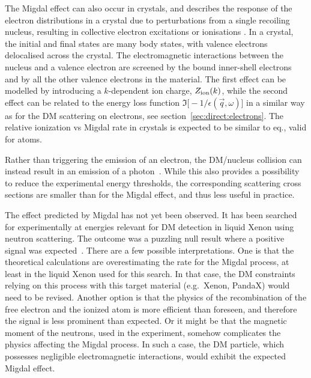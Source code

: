 \medskip


The Migdal effect can also occur in crystals, and describes the response of the electron distributions in a crystal due to perturbations  from a single recoiling nucleus, resulting in collective electron excitations or ionisations \cite{crystal:Migdal}. In a crystal, the initial and final states are many body states, with valence electrons delocalised across the crystal. The electromagnetic interactions between the nucleus and a valence electron are screened by the bound inner-shell electrons and by all the other valence electrons in the material. The first effect can be modelled by introducing a $k$-dependent ion charge, $Z_{\rm ion}(k)$, while the second effect can be related to the energy loss function $\Im\big[-1/\epsilon(\vec q,\omega)\big]$ in a similar way as for the DM scattering on electrons, see section~\ref{sec:direct:electrons}. 
The relative ionization vs Migdal rate in crystals is expected to be similar to eq., valid for atoms.


Rather than triggering the emission of an electron, the DM/nucleus collision can instead result in an emission of a photon~\cite{photon:DM:scattering}. 
While this also provides a possibility to reduce the experimental energy thresholds, the corresponding scattering cross sections are smaller than for the Migdal effect, and thus less useful in practice. 

\medskip


The effect predicted by Migdal has not yet been observed.
It has been searched for experimentally at energies relevant for DM detection in liquid Xenon using neutron scattering.
The outcome was a puzzling null result where a positive signal was expected~\cite{exp:Migdal}. 
There are a few possible interpretations. 
One is that the theoretical calculations are overestimating the rate for the Migdal process, at least in the liquid Xenon used for this search. In that case, the DM constraints relying on this process with this target material (e.g.~{\sc Xenon, PandaX}) would need to be revised. 
Another option is that the physics of the recombination of the free electron and the ionized atom is more efficient than foreseen, and therefore the signal is less prominent than expected.
Or it might be that the magnetic moment of the neutrons, used in the experiment, somehow complicates the physics affecting the Migdal process. In such a case, the DM particle, which possesses negligible electromagnetic interactions, would exhibit the expected Migdal effect.


